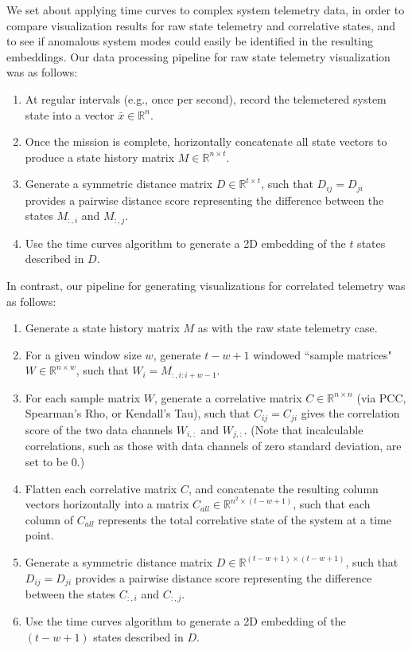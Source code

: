 We set about applying time curves to complex system telemetry data, in order to compare visualization results for raw state telemetry and correlative states, and to see if anomalous system modes could easily be identified in the resulting embeddings. Our data processing pipeline for raw state telemetry visualization was as follows:

\begin{enumerate}
    \item At regular intervals (e.g., once per second), record the telemetered system state into a vector $\bar{x} \in \mathbb{R}^{n}$.
    \item Once the mission is complete, horizontally concatenate all state vectors to produce a state history matrix $M \in \mathbb{R}^{n \times t}$.
    \item Generate a symmetric distance matrix $D \in \mathbb{R}^{t \times t}$, such that $D_{ij} = D_{ji}$ provides a pairwise distance score representing the difference between the states $M_{:,i}$ and $M_{:,j}$.
    \item Use the time curves algorithm to generate a 2D embedding of the $t$ states described in $D$.
\end{enumerate}

In contrast, our pipeline for generating visualizations for correlated telemetry was as follows:

\begin{enumerate}
    \item Generate a state history matrix $M$ as with the raw state telemetry case.
    \item For a given window size $w$, generate $t - w + 1$ windowed ``sample matrices" $W \in \mathbb{R}^{n \times w}$, such that $W_{i} = M_{:, i:i+w-1}$.
    \item For each sample matrix $W$, generate a correlative matrix $C \in \mathbb{R}^{n \times n}$ (via PCC, Spearman's Rho, or Kendall's Tau), such that $C_{ij} = C_{ji}$ gives the correlation score of the two data channels $W_{i,:}$ and $W_{j,:}$. (Note that incalculable correlations, such as those with data channels of zero standard deviation, are set to be 0.)
    \item Flatten each correlative matrix $C$, and concatenate the resulting column vectors horizontally into a matrix $C_{all} \in \mathbb{R}^{n^{2} \times (t - w + 1)}$, such that each column of $C_{all}$ represents the total correlative state of the system at a time point.
    \item Generate a symmetric distance matrix $D \in \mathbb{R}^{(t - w + 1) \times (t - w + 1)}$, such that $D_{ij} = D_{ji}$ provides a pairwise distance score representing the difference between the states $C_{:,i}$ and $C_{:,j}$.
    \item Use the time curves algorithm to generate a 2D embedding of the $(t - w + 1)$ states described in $D$.
\end{enumerate}

